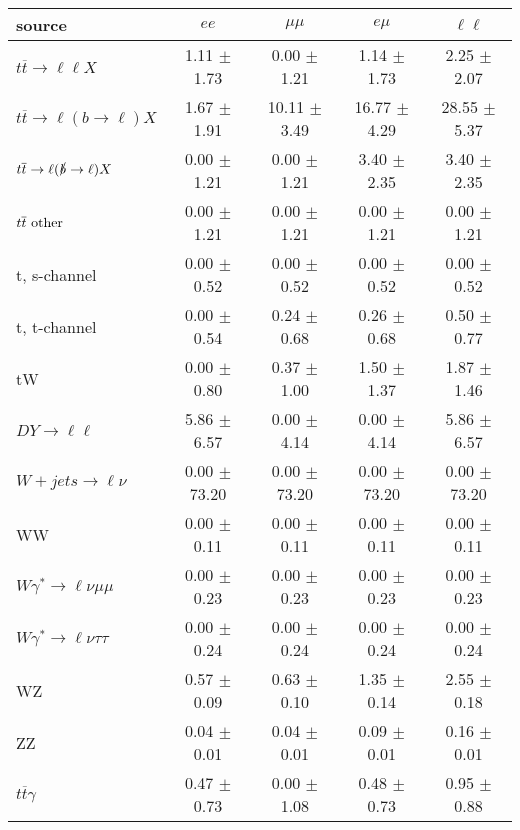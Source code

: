 \begin{tabular}{l|cccc} \hline\hline
source & $ee$ & $\mu\mu$ & $e\mu$ & $\ell\ell $ \\
\hline
$t\overline{t} \rightarrow \ell \ell X$ &  1.11 $\pm$  1.73 &  0.00 $\pm$  1.21 &  1.14 $\pm$  1.73 &  2.25 $\pm$  2.07 \\
$t\overline{t} \rightarrow \ell (b \rightarrow \ell) X$ &  1.67 $\pm$  1.91 & 10.11 $\pm$  3.49 & 16.77 $\pm$  4.29 & 28.55 $\pm$  5.37 \\
$t\overline{t} \rightarrow \ell (\slashed b \rightarrow \ell) X$ &  0.00 $\pm$  1.21 &  0.00 $\pm$  1.21 &  3.40 $\pm$  2.35 &  3.40 $\pm$  2.35 \\
        $t\overline{t}\ \rm{other}$ &  0.00 $\pm$  1.21 &  0.00 $\pm$  1.21 &  0.00 $\pm$  1.21 &  0.00 $\pm$  1.21 \\
\hline
                       t, s-channel &  0.00 $\pm$  0.52 &  0.00 $\pm$  0.52 &  0.00 $\pm$  0.52 &  0.00 $\pm$  0.52 \\
                       t, t-channel &  0.00 $\pm$  0.54 &  0.24 $\pm$  0.68 &  0.26 $\pm$  0.68 &  0.50 $\pm$  0.77 \\
                                 tW &  0.00 $\pm$  0.80 &  0.37 $\pm$  1.00 &  1.50 $\pm$  1.37 &  1.87 $\pm$  1.46 \\
\hline
         $DY \rightarrow \ell \ell$ &  5.86 $\pm$  6.57 &  0.00 $\pm$  4.14 &  0.00 $\pm$  4.14 &  5.86 $\pm$  6.57 \\
      $W+jets \rightarrow \ell \nu$ &  0.00 $\pm$ 73.20 &  0.00 $\pm$ 73.20 &  0.00 $\pm$ 73.20 &  0.00 $\pm$ 73.20 \\
                                 WW &  0.00 $\pm$  0.11 &  0.00 $\pm$  0.11 &  0.00 $\pm$  0.11 &  0.00 $\pm$  0.11 \\
\hline
$W\gamma^{*} \rightarrow \ell \nu \mu\mu$ &  0.00 $\pm$  0.23 &  0.00 $\pm$  0.23 &  0.00 $\pm$  0.23 &  0.00 $\pm$  0.23 \\
$W\gamma^{*} \rightarrow \ell \nu \tau\tau$ &  0.00 $\pm$  0.24 &  0.00 $\pm$  0.24 &  0.00 $\pm$  0.24 &  0.00 $\pm$  0.24 \\
                                 WZ &  0.57 $\pm$  0.09 &  0.63 $\pm$  0.10 &  1.35 $\pm$  0.14 &  2.55 $\pm$  0.18 \\
                                 ZZ &  0.04 $\pm$  0.01 &  0.04 $\pm$  0.01 &  0.09 $\pm$  0.01 &  0.16 $\pm$  0.01 \\
\hline
              $t\overline{t}\gamma$ &  0.47 $\pm$  0.73 &  0.00 $\pm$  1.08 &  0.48 $\pm$  0.73 &  0.95 $\pm$  0.88 \\

\end{tabular}
